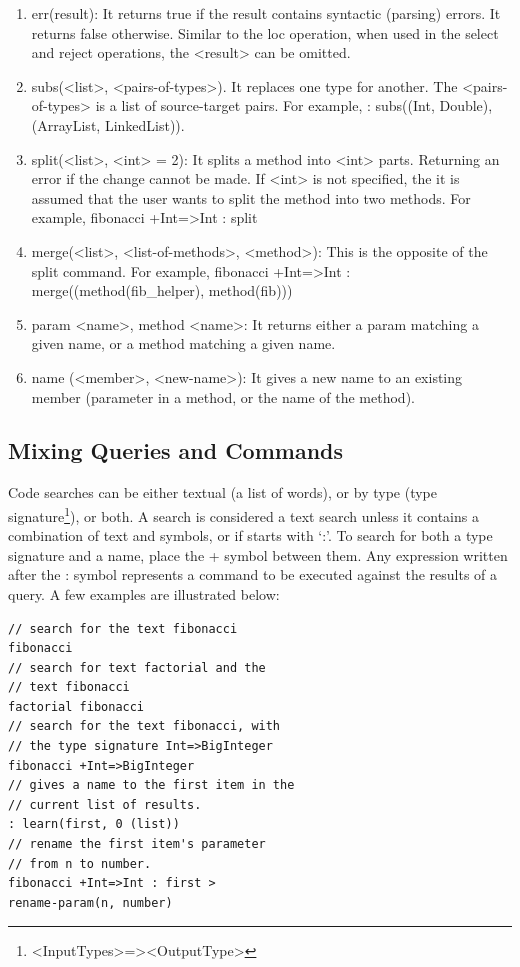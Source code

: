 \begin{enumerate}
	\item err(result): It returns true if the result contains syntactic (parsing) errors. 
	It returns false otherwise. Similar to the loc operation, when used in the select and reject 
	operations, the <result> can be omitted.
	
	\item subs(<list>, <pairs-of-types>). It replaces one type for another. The 
	<pairs-of-types> is a list of source-target pairs. For example, : subs((Int, Double),
	(ArrayList, LinkedList)).
	
	\item split(<list>, <int> = 2): It splits a method into <int> parts. Returning an 
	error if the change cannot be made. If <int> is not specified, the it is assumed that the user 
	wants to split the method into two methods. For example, fibonacci +Int=>Int : split

   \item merge(<list>, <list-of-methods>, <method>): This is the opposite of the split command. 
	For example, fibonacci +Int=>Int : merge((method(fib\_helper), method(fib)))
	
	\item param <name>, method <name>: It returns either a param matching a given name, 
	or a method matching a given name.
	
	\item name (<member>, <new-name>): It gives a new name to an existing member (parameter in 
	a method, or the name of the method).
	
\end{enumerate}

\subsection{Mixing Queries and Commands}
\label{sec:queriescommands}

Code searches can be either textual (a list of words), or by type (type signature\footnote{<InputTypes>=><OutputType>}), or both. A search is considered a text search unless it contains a combination of text and symbols, or if starts with `:'. To search for both a type signature and a name, place the + symbol between them. Any expression written after the : symbol represents a command to be executed against the results of a query. A few examples are illustrated below:

\begin{verbatim}
// search for the text fibonacci	
fibonacci
// search for text factorial and the 
// text fibonacci
factorial fibonacci
// search for the text fibonacci, with 
// the type signature Int=>BigInteger 
fibonacci +Int=>BigInteger 
// gives a name to the first item in the 
// current list of results.
: learn(first, 0 (list))
// rename the first item's parameter 
// from n to number.
fibonacci +Int=>Int : first > 
rename-param(n, number) 
\end{verbatim}
	 
